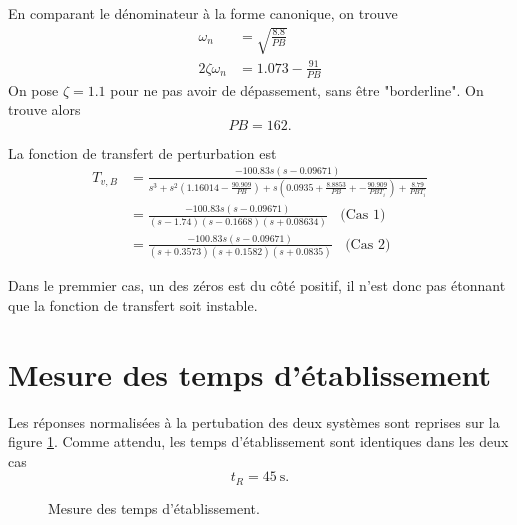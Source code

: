 \documentclass[frenchb, paper=a4, fontsize=11pt]{scrartcl}
\numberwithin{equation}{section}					%
\numberwithin{figure}{section}					%
\numberwithin{table}{section}						%
\begin{document}
En comparant le dénominateur à la forme canonique, on trouve
\begin{align*}
\omega_n &= \sqrt{\frac{8.8}{PB}}\\
2\zeta \omega_n &= 1.073-\frac{91}{PB} 
\end{align*}
On pose $\zeta=1.1$ pour ne pas avoir de dépassement, sans être "borderline". On trouve alors 
\begin{equation}
PB=162.
\end{equation}

La fonction de transfert de perturbation est 
\begin{align*}
T_{v,B} &= \frac{-100.83 s (s-0.09671)}{s^3 + s^2 (1.16014-\frac{90.909}{PB})+ s(0.0935 + \frac{8.8853}{PB} + - \frac{90.909}{PBT_i}) + \frac{8.79}{PBT_i}} \\
&=  \frac{-100.83 s (s-0.09671)}{(s-1.74)(s-0.1668)(s+0.08634)} \ \ \ \ \text{(Cas 1)}\\
&=  \frac{-100.83 s (s-0.09671)}{(s+0.3573)(s+0.1582)(s+0.0835)} \ \ \ \  \text{(Cas 2)}
\end{align*}

Dans le premmier cas, un des zéros est du côté positif, il n'est donc pas étonnant que la fonction de transfert soit instable.




\section{Mesure des temps d'établissement}
Les réponses normalisées à la pertubation des deux systèmes sont
reprises sur la figure \ref{fig:settling-time}. Comme attendu,
les temps d'établissement sont identiques dans les deux cas
\begin{equation}
	t_R = \SI{45}{\second}.
\end{equation}

\begin{figure}[ht]
	\centering
	
	\caption{Mesure des temps d'établissement.}
	\label{fig:settling-time}
\end{figure}
\end{document}
